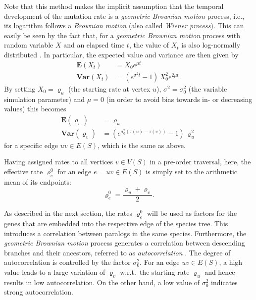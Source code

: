 \documentclass[hidelinks,11pt]{scrreprt}
\begin{document}
Note that this method makes the implicit assumption that the temporal development of the mutation rate is a \emph{geometric Brownian motion} process, i.e., its logarithm follows a \emph{Brownian motion} (also called \emph{Wiener process}).
This can easily be seen by the fact that, for a \emph{geometric Brownian motion} process with random variable $X$ and an elapsed time $t$, the value of $X_t$ is also log-normally distributed \citep{oksendal1998}.
In particular, the expected value and variance are then given by 
\begin{equation}
\begin{aligned}
\mathbf{E}(X_t) &= X_0 e^{\mu t} \\
\mathbf{Var}(X_t) &= (e^{\sigma^2 t} -1)\, X_0^2 e^{2\mu t}.
\end{aligned}
\end{equation}
By setting $X_0=\varrho_u$ (the starting rate at vertex $u$), $\sigma^2=\sigma_0^2$ (the variable simulation parameter) and $\mu=0$ (in order to avoid bias towards in- or decreasing values) this becomes
\begin{equation}
\begin{aligned}
\mathbf{E}(\varrho_v) &= \varrho_u\\
\mathbf{Var}(\varrho_v) &= (e^{\sigma_0^2 (\tau(u)-\tau(v))} -1)\, \varrho_u^2
\end{aligned}
\end{equation}
for a specific edge $uv \in E(S)$, which is the same as above.

Having assigned rates to all vertices $v \in V(S)$ in a pre-order traversal, here, the effective rate $\varrho^0_e$ for an edge $e=uv \in E(S)$ is simply set to the arithmetic mean of its endpoints:
\begin{equation}
\varrho^0_e = \frac{\varrho_u + \varrho_v}{2}.
\end{equation}

As described in the next section, the rates $\varrho^0_e$ will be used as factors for the genes that are embedded into the respective edge of the species tree. This introduces a correlation between paralogs in the same species. Furthermore, the \emph{geometric Brownian motion} process generates a correlation between descending branches and their ancestors, referred to as \emph{autocorrelation} \citep{kishino2001}. The degree of autocorrelation is controlled by the factor $\sigma^2_0$. For an edge $uv \in E(S)$, a high value leads to a large variation of $\varrho_v$ w.r.t.\ the starting rate $\varrho_u$ and hence results in low autocorrelation. On the other hand, a low value of $\sigma^2_0$ indicates strong autocorrelation.
\end{document}
